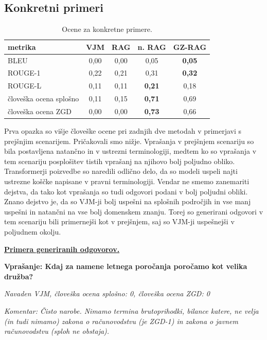 \documentclass[a4paper,12pt,openright]{book}
\begin{document}
\subsection{Konkretni primeri}

\begin{table}[H]
\centering
\caption{Ocene za konkretne primere.}
\begin{tabular}{|l|c|c|c|c|}
\hline
metrika  & VJM & RAG & n. RAG & GZ-RAG \\ \hline
BLEU           & 0,00     & 0,00     & 0,05     & \textbf{0,05}     \\ \hline
ROUGE-1        & 0,22     & 0,21     & 0,31     & \textbf{0,32}     \\ \hline
ROUGE-L        & 0,11     & 0,11     & \textbf{0,21}     & 0,18     \\ \hline
človeška ocena splošno & 0,11     & 0,15     & \textbf{0,71}     & 0,69     \\ \hline
človeška ocena ZGD & 0,00     & 0,00     & \textbf{0,73}     & 0,66     \\ \hline
\end{tabular}
\end{table}

Prva opazka so višje človeške ocene pri zadnjih dve metodah v primerjavi s prejšnjim scenarijem. Pričakovali smo nižje. Vprašanja v prejšnjem scenariju so bila postavljena natančno in v ustrezni terminologiji, medtem ko so vprašanja v tem scenariju posplošitev tistih vprašanj na njihovo bolj poljudno obliko. Transformerji poizvedbe so naredili odlično delo, da so modeli uspeli najti ustrezne koščke napisane v pravni terminologiji. Vendar ne smemo zanemariti dejstva, da tako kot vprašanja so tudi odgovori podani v bolj poljudni obliki. Znano dejstvo je, da so VJM-ji bolj uspešni na splošnih področjih in vse manj uspešni in natančni na vse bolj domenskem znanju. Torej so generirani odgovori v tem scenariju bili primernejši kot v prejšnjem, saj so VJM-ji uspešnejši v poljudnem okolju.

\underline{\textbf{Primera generiranih odgovorov.}}

\textbf{Vprašanje: Kdaj za namene letnega poročanja poročamo kot velika družba?}

\textit{Navaden VJM, človeška ocena splošno: 0, človeška ocena ZGD: 0}

\textit{Komentar: Čisto narobe. Nimamo termina brutoprihodki, bilance katere, ne velja (in tudi nimamo) zakona o računovodstvu (je ZGD-1) in zakona o javnem računovodstvu (sploh ne obstaja).}
\end{document}
